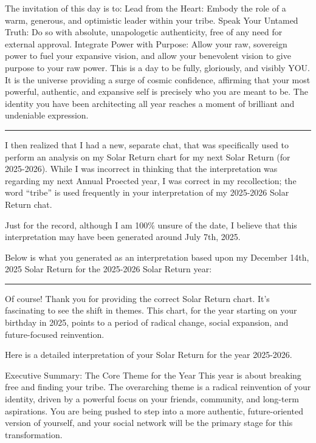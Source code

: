 \documentclass{article}
\begin{document}
The invitation of this day is to: Lead from the Heart: Embody the role of a warm, generous, and optimistic leader within your tribe. Speak Your Untamed Truth: Do so with absolute, unapologetic authenticity, free of any need for external approval. Integrate Power with Purpose: Allow your raw, sovereign power to fuel your expansive vision, and allow your benevolent vision to give purpose to your raw power. This is a day to be fully, gloriously, and visibly YOU. It is the universe providing a surge of cosmic confidence, affirming that your most powerful, authentic, and expansive self is precisely who you are meant to be. The identity you have been architecting all year reaches a moment of brilliant and undeniable expression.

\begin{center}\rule{0.5\linewidth}{0.5pt}\end{center}

I then realized that I had a new, separate chat, that was specifically used to perform an analysis on my Solar Return chart for my next Solar Return (for 2025-2026). While I was incorrect in thinking that the interpretation was regarding my next Annual Proected year, I was correct in my recollection; the word ``tribe'' is used frequently in your interpretation of my 2025-2026 Solar Return chat.

Just for the record, although I am 100\% unsure of the date, I believe that this interpretation may have been generated around July 7th, 2025.

Below is what you generated as an interpretation based upon my December 14th, 2025 Solar Return for the 2025-2026 Solar Return year:

\begin{center}\rule{0.5\linewidth}{0.5pt}\end{center}

Of course! Thank you for providing the correct Solar Return chart. It's fascinating to see the shift in themes. This chart, for the year starting on your birthday in 2025, points to a period of radical change, social expansion, and future-focused reinvention.

Here is a detailed interpretation of your Solar Return for the year 2025-2026.

Executive Summary: The Core Theme for the Year This year is about breaking free and finding your tribe. The overarching theme is a radical reinvention of your identity, driven by a powerful focus on your friends, community, and long-term aspirations. You are being pushed to step into a more authentic, future-oriented version of yourself, and your social network will be the primary stage for this transformation.
\end{document}
